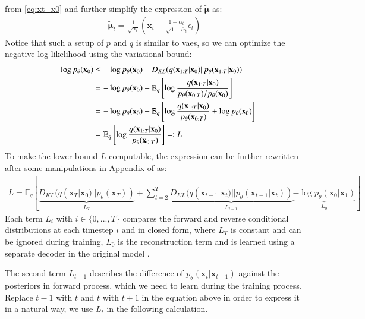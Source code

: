 \documentclass[12pt,DIV14,BCOR12mm,a4paper,footinclude=false,headinclude,parskip=half-,twoside,openright,cleardoublepage=empty,toc=index,bibliography=totoc,listof=totoc]{scrreprt}
\numberwithin{equation}{chapter}
\begin{document}
from \ref{eq:xt_x0} and further simplify the expression of $\boldsymbol{\tilde{\mu}}$ as:
\begin{align}\label{eq:mu_tilde}
  \boldsymbol{\tilde{\mu}}_{t} = \frac{1}{\sqrt{\alpha_{t}}}\left(\mathbf{x}_{t} - \frac{1-\alpha_{t}}{\sqrt{1-\bar{\alpha}_{t}}}\epsilon_{t}\right)
\end{align}
Notice that such a setup of $p$ and $q$ is similar to \glspl{vae}, so we can optimize the negative log-likelihood using the variational bound:
\begin{align}
  -\log p_{\theta}(\mathbf{x}_{0}) &\leq -\log p_{\theta}(\mathbf{x}_{0}) + D_{KL}(q(\mathbf{x}_{1:T}|\mathbf{x}_{0})||p_{\theta}(\mathbf{x}_{1:T}|\mathbf{x}_{0}))\notag\\
                                   &= -\log p_{\theta}(\mathbf{x}_{0}) + \mathbb{E}_{q}\left[\log\frac{q(\mathbf{x}_{1:T}|\mathbf{x}_{0})}{p_{\theta}(\mathbf{x}_{0:T})/p_{\theta}(\mathbf{x}_{0})}\right]\notag\\       
                                   &= -\log p_{\theta}(\mathbf{x}_{0}) + \mathbb{E}_{q}\left[\log\frac{q(\mathbf{x}_{1:T}|\mathbf{x}_{0})}{p_{\theta}(\mathbf{x}_{0:T})} + \log p_{\theta}(\mathbf{x}_{0})\right]\notag\\
                                   &= \mathbb{E}_{q}\left[\log\frac{q(\mathbf{x}_{1:T}|\mathbf{x}_{0})}{p_{\theta}(\mathbf{x}_{0:T})}\right] =: L             
\end{align}
To make the lower bound $L$ computable, the expression can be further rewritten after some manipulations in Appendix of \cite{ho2020denoising} as:
\begin{align}
  L = \mathbb{E}_{q}\left[\underbrace{D_{KL}(q(\mathbf{x}_{T}|\mathbf{x}_{0})||p_{\theta}(\mathbf{x}_{T}))}_{L_{T}} + \sum_{t=2}^{T}\underbrace{D_{KL}(q(\mathbf{x}_{t-1}|\mathbf{x}_{t})||p_{\theta}(\mathbf{x}_{t-1}|\mathbf{x}_{t}))}_{L_{t-1}} \underbrace{- \log p_{\theta}(\mathbf{x}_{0}|\mathbf{x}_{1})}_{L_{0}}\right]
\end{align}
Each term $L_{i}$ with $i\in \{0,...,T\}$ compares the forward and reverse conditional distributions at each timestep $i$ and in closed form, where $L_{T}$ is constant and can be ignored during training, $L_{0}$ is the reconstruction term and is learned using a separate decoder in the original model \cite{weng2021diffusion}.

The second term $L_{t-1}$ describes the difference of $p_{\theta}(\mathbf{x}_{t}|\mathbf{x}_{t-1})$ against the posteriors in forward process, which we need to learn during the training process. Replace $t-1$ with $t$ and $t$ with $t+1$ in the equation above in order to express it in a natural way, we use $L_{t}$ in the following calculation.
\end{document}
